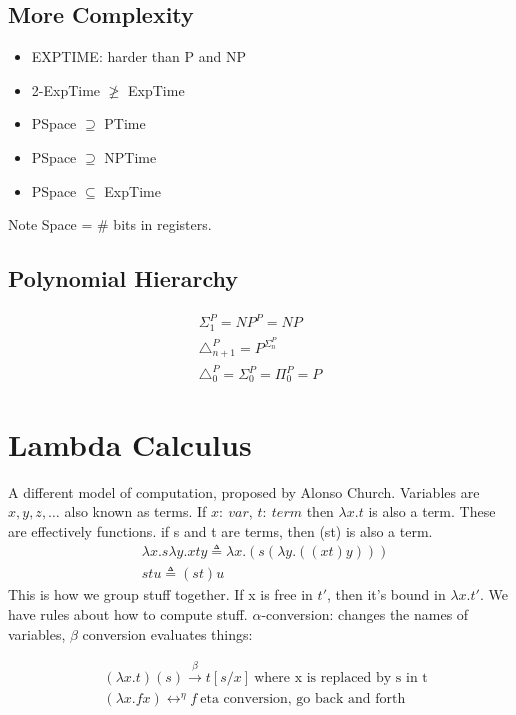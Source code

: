 \documentclass{article}
\newcommand{\asdef}{\triangleq}
\begin{document}
\subsection{More Complexity}
\begin{itemize}
    \item EXPTIME: harder than P and NP
    \item 2-ExpTime $\ngeq$ ExpTime
    \item PSpace $\supseteq$ PTime
    \item PSpace $\supseteq$ NPTime
    \item PSpace $\subseteq$ ExpTime
\end{itemize}

Note Space = \# bits in registers.

\subsection{Polynomial Hierarchy}
\begin{align*}
    \Sigma_1^P = NP^P = NP \\
    \triangle_{n+1}^P = P^{\Sigma_n^P} \\
    \triangle_0^P = \Sigma_0^P = \Pi_0^P = P
\end{align*}

\section{Lambda Calculus}
A different model of computation, proposed by Alonso Church. Variables are $x, y, z, \dots$ also known as terms. If $x:\ var$, $t:\ term$ then $\lambda x.t$ is also a term. These are effectively functions.
\vskip 0.1in
if s and t are terms, then (st) is also a term.
\begin{align*}
    & \lambda x.s\lambda y.xty \asdef \lambda x.(s(\lambda y.((xt)y))) \\
    & stu \asdef (st)u
\end{align*}
This is how we group stuff together. 
\vskip 0.1in
If x is free in $t'$, then it's bound in $\lambda x.t'$. We have rules about how to compute stuff. $\alpha$-conversion: changes the names of variables, $\beta$ conversion evaluates things:

\begin{align*}
    & (\lambda x.t)(s) \xrightarrow{\beta} t[s / x]\ \text{where x is replaced by s in t} \\
    & (\lambda x.fx) \leftrightarrow^\eta f\ \text{eta conversion, go back and forth}
\end{align*}
\end{document}
